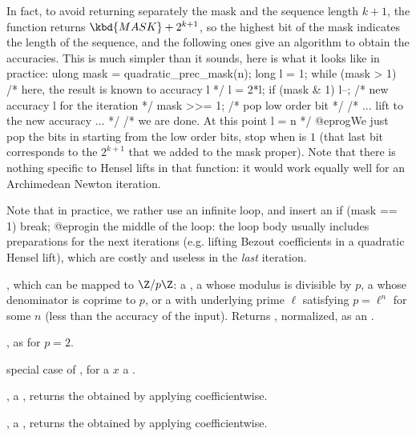 In fact, to avoid returning separately the mask and the sequence length
$k+1$, the function returns $\kbd{MASK} + 2^{k+1}$, so the highest bit of
the mask indicates the length of the sequence, and the following ones give
an algorithm to obtain the accuracies. This is much simpler than it sounds,
here is what it looks like in practice:
\bprog
  ulong mask = quadratic_prec_mask(n);
  long l = 1;
  while (mask > 1) {            /* here, the result is known to accuracy l */
    l = 2*l; if (mask & 1) l--; /* new accuracy l for the iteration */
    mask >>= 1;                 /* pop low order bit */
    /* ... lift to the new accuracy ... */
  }
  /* we are done. At this point l = n */
@eprog\noindent We just pop the bits in  starting from the low
order bits, stop when  is $1$ (that last bit corresponds to the
$2^{k+1}$ that we added to the mask proper). Note that there is nothing
specific to Hensel lifts in that function: it would work equally well for
an Archimedean Newton iteration.

Note that in practice, we rather use an infinite loop, and insert an
\bprog
  if (mask == 1) break;
@eprog\noindent in the middle of the loop: the loop body usually includes
preparations for the next iterations (e.g. lifting Bezout coefficients
in a quadratic Hensel lift), which are costly and useless in the \emph{last}
iteration.



,  which can be mapped to
$\Z/p\Z$: a , a  whose modulus is divisible by $p$,
a  whose denominator is coprime to $p$, or a  with
underlying prime $\ell$ satisfying $p = \ell^n$ for some $n$ (less than the
accuracy of the input). Returns , normalized, as an
.

, as  for $p = 2$.

 special case of ,
for a $x$ a .

,  a , returns the
 obtained by applying  coefficientwise.

,  a , returns the
 obtained by applying  coefficientwise.

